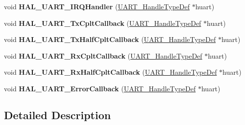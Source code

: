 \begin{DoxyCompactItemize}
\item 
void {\bfseries H\+A\+L\+\_\+\+U\+A\+R\+T\+\_\+\+I\+R\+Q\+Handler} (\hyperlink{struct_u_a_r_t___handle_type_def}{U\+A\+R\+T\+\_\+\+Handle\+Type\+Def} $\ast$huart)\hypertarget{group___u_a_r_t___exported___functions___group2_gaad01472c507ceee3c5f2274c775ff3bf}{}\label{group___u_a_r_t___exported___functions___group2_gaad01472c507ceee3c5f2274c775ff3bf}

\item 
void {\bfseries H\+A\+L\+\_\+\+U\+A\+R\+T\+\_\+\+Tx\+Cplt\+Callback} (\hyperlink{struct_u_a_r_t___handle_type_def}{U\+A\+R\+T\+\_\+\+Handle\+Type\+Def} $\ast$huart)\hypertarget{group___u_a_r_t___exported___functions___group2_gabcdf9b59049eccbc87d54042f9235b1a}{}\label{group___u_a_r_t___exported___functions___group2_gabcdf9b59049eccbc87d54042f9235b1a}

\item 
void {\bfseries H\+A\+L\+\_\+\+U\+A\+R\+T\+\_\+\+Tx\+Half\+Cplt\+Callback} (\hyperlink{struct_u_a_r_t___handle_type_def}{U\+A\+R\+T\+\_\+\+Handle\+Type\+Def} $\ast$huart)\hypertarget{group___u_a_r_t___exported___functions___group2_ga49b287e7de94cd0a38d333629298f7c4}{}\label{group___u_a_r_t___exported___functions___group2_ga49b287e7de94cd0a38d333629298f7c4}

\item 
void {\bfseries H\+A\+L\+\_\+\+U\+A\+R\+T\+\_\+\+Rx\+Cplt\+Callback} (\hyperlink{struct_u_a_r_t___handle_type_def}{U\+A\+R\+T\+\_\+\+Handle\+Type\+Def} $\ast$huart)\hypertarget{group___u_a_r_t___exported___functions___group2_gae494a9643f29b87d6d81e5264e60e57b}{}\label{group___u_a_r_t___exported___functions___group2_gae494a9643f29b87d6d81e5264e60e57b}

\item 
void {\bfseries H\+A\+L\+\_\+\+U\+A\+R\+T\+\_\+\+Rx\+Half\+Cplt\+Callback} (\hyperlink{struct_u_a_r_t___handle_type_def}{U\+A\+R\+T\+\_\+\+Handle\+Type\+Def} $\ast$huart)\hypertarget{group___u_a_r_t___exported___functions___group2_ga1884970cc493d8efba5aec28c0d526e7}{}\label{group___u_a_r_t___exported___functions___group2_ga1884970cc493d8efba5aec28c0d526e7}

\item 
void {\bfseries H\+A\+L\+\_\+\+U\+A\+R\+T\+\_\+\+Error\+Callback} (\hyperlink{struct_u_a_r_t___handle_type_def}{U\+A\+R\+T\+\_\+\+Handle\+Type\+Def} $\ast$huart)\hypertarget{group___u_a_r_t___exported___functions___group2_ga0e0456ea96d55db31de947fb3e954f18}{}\label{group___u_a_r_t___exported___functions___group2_ga0e0456ea96d55db31de947fb3e954f18}

\end{DoxyCompactItemize}


\subsection{Detailed Description}
